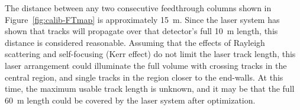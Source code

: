 The distance between any two consecutive feedthrough columns shown in Figure~\ref{fig:calib-FTmap} is approximately \SI{15}{\m}. Since the  laser system has shown that tracks will propagate over that detector's full \SI{10}{\m} length, this distance is considered reasonable.   Assuming that the effects of Rayleigh scattering and self-focusing (Kerr effect) do not limit the laser track length, this laser arrangement could illuminate the full volume with crossing tracks in the central region, and single tracks %
in the region closer to the end-walls.  %
At this time, the maximum usable track length is unknown, and it may be that the full \SI{60}{\m} \detmodule length could be covered by the laser system after optimization.
